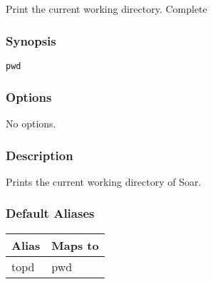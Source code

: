 \subsection{}
\label{pwd}
Print the current working directory. 
 Complete
\subsubsection*{Synopsis}
\begin{verbatim}
pwd
\end{verbatim}
\subsubsection*{Options}
 No options. 
\subsubsection*{Description}
 Prints the current working directory of Soar. 
\subsubsection*{Default Aliases}
\begin{tabular}{|l|l|}
\hline 
 Alias  & Maps to  \\
 \hline 
 topd  & pwd  \\
 \hline 
\end{tabular}
